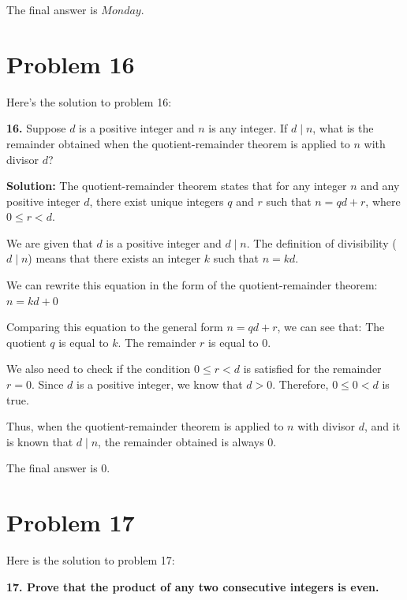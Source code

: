 \documentclass{article}
\begin{document}
The final answer is $\boxed{Monday}$.

\newpage

\section*{\textbf{Problem 16}}
Here's the solution to problem 16:

\textbf{16.} Suppose $d$ is a positive integer and $n$ is any integer. If $d \mid n$, what is the remainder obtained when the quotient-remainder theorem is applied to $n$ with divisor $d$?

\textbf{Solution:}
The quotient-remainder theorem states that for any integer $n$ and any positive integer $d$, there exist unique integers $q$ and $r$ such that $n = qd + r$, where $0 \le r < d$.

We are given that $d$ is a positive integer and $d \mid n$.
The definition of divisibility ($d \mid n$) means that there exists an integer $k$ such that $n = kd$.

We can rewrite this equation in the form of the quotient-remainder theorem:
$n = kd + 0$

Comparing this equation to the general form $n = qd + r$, we can see that:
The quotient $q$ is equal to $k$.
The remainder $r$ is equal to $0$.

We also need to check if the condition $0 \le r < d$ is satisfied for the remainder $r=0$.
Since $d$ is a positive integer, we know that $d > 0$.
Therefore, $0 \le 0 < d$ is true.

Thus, when the quotient-remainder theorem is applied to $n$ with divisor $d$, and it is known that $d \mid n$, the remainder obtained is always 0.

The final answer is $\boxed{0}$.

\newpage

\section*{\textbf{Problem 17}}
Here is the solution to problem 17:

\textbf{17. Prove that the product of any two consecutive integers is even.}
\end{document}
